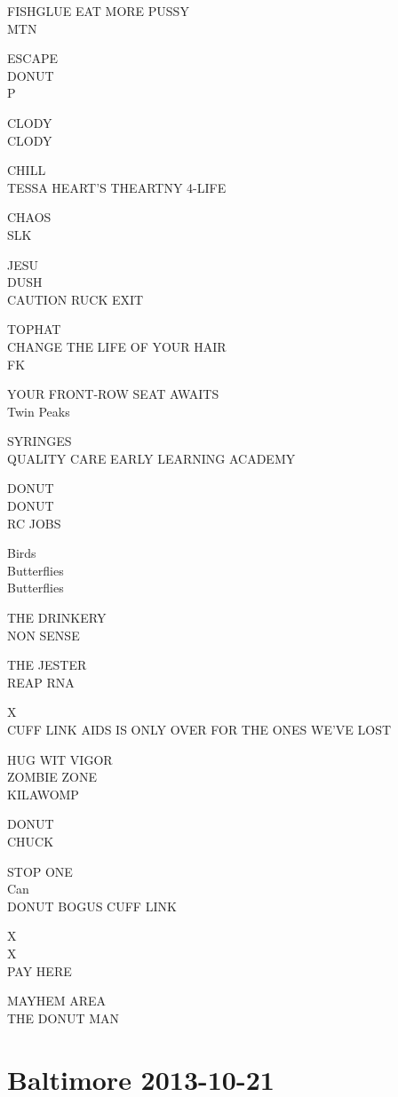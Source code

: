 \documentclass[10pt,letterpaper]{article}
\begin{document}
FISHGLUE EAT MORE PUSSY\\
MTN

ESCAPE\\
DONUT\\
P

CLODY\\
CLODY

CHILL\\
TESSA HEART'S THEARTNY 4{-}LIFE

CHAOS\\
SLK

JESU\\
DUSH\\
CAUTION RUCK EXIT

TOPHAT\\
CHANGE THE LIFE OF YOUR HAIR\\
FK

YOUR FRONT{-}ROW SEAT AWAITS\\
Twin Peaks

SYRINGES\\
QUALITY CARE EARLY LEARNING ACADEMY

DONUT\\
DONUT\\
RC JOBS

Birds\\
Butterflies\\
Butterflies

THE DRINKERY\\
NON SENSE

THE JESTER\\
REAP RNA

X\\
CUFF LINK AIDS IS ONLY OVER FOR THE ONES WE'VE LOST

HUG WIT VIGOR\\
ZOMBIE ZONE\\
KILAWOMP

DONUT\\
CHUCK

STOP ONE\\
Can\\
DONUT BOGUS CUFF LINK

X\\
X\\
PAY HERE

MAYHEM AREA\\
THE DONUT MAN
\

\section*{Baltimore 2013-10-21}
\end{document}
